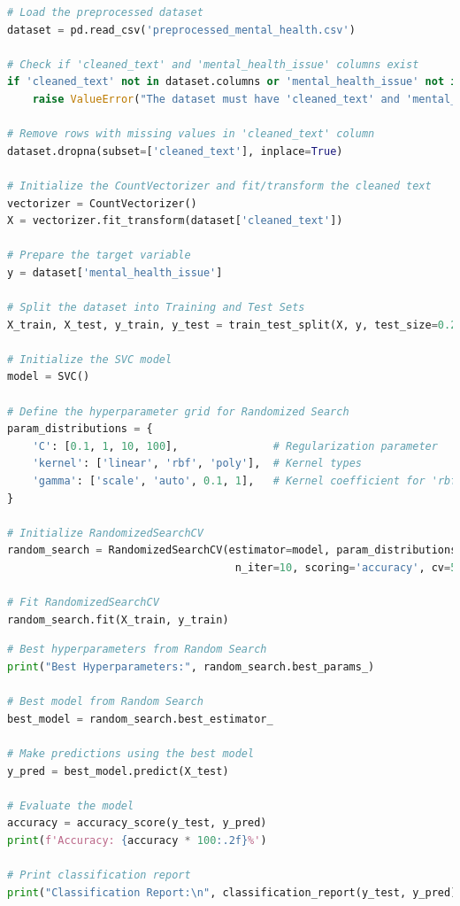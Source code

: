 \begin{tcolorbox}[colback=gray!5!white, colframe=gray!80!black, boxrule=0.5pt, title=Support Vector Machine]
    \begin{lstlisting}[language=Python]
# Load the preprocessed dataset
dataset = pd.read_csv('preprocessed_mental_health.csv')

# Check if 'cleaned_text' and 'mental_health_issue' columns exist
if 'cleaned_text' not in dataset.columns or 'mental_health_issue' not in dataset.columns:
    raise ValueError("The dataset must have 'cleaned_text' and 'mental_health_issue' columns.")

# Remove rows with missing values in 'cleaned_text' column
dataset.dropna(subset=['cleaned_text'], inplace=True)

# Initialize the CountVectorizer and fit/transform the cleaned text
vectorizer = CountVectorizer()
X = vectorizer.fit_transform(dataset['cleaned_text'])

# Prepare the target variable
y = dataset['mental_health_issue']

# Split the dataset into Training and Test Sets
X_train, X_test, y_train, y_test = train_test_split(X, y, test_size=0.2, random_state=42)

# Initialize the SVC model
model = SVC()

# Define the hyperparameter grid for Randomized Search
param_distributions = {
    'C': [0.1, 1, 10, 100],               # Regularization parameter
    'kernel': ['linear', 'rbf', 'poly'],  # Kernel types
    'gamma': ['scale', 'auto', 0.1, 1],   # Kernel coefficient for 'rbf', 'poly', and 'sigmoid'
}

# Initialize RandomizedSearchCV
random_search = RandomizedSearchCV(estimator=model, param_distributions=param_distributions,
                                    n_iter=10, scoring='accuracy', cv=5, n_jobs=-1, random_state=42)

# Fit RandomizedSearchCV
random_search.fit(X_train, y_train)
\end{lstlisting}
\end{tcolorbox}

\begin{tcolorbox}[colback=gray!5!white, colframe=gray!80!black, boxrule=0.5pt, title=Support Vector Machine]
    \begin{lstlisting}[language=Python]
# Best hyperparameters from Random Search
print("Best Hyperparameters:", random_search.best_params_)

# Best model from Random Search
best_model = random_search.best_estimator_

# Make predictions using the best model
y_pred = best_model.predict(X_test)

# Evaluate the model
accuracy = accuracy_score(y_test, y_pred)
print(f'Accuracy: {accuracy * 100:.2f}%')

# Print classification report
print("Classification Report:\n", classification_report(y_test, y_pred))
\end{lstlisting}
\end{tcolorbox}

